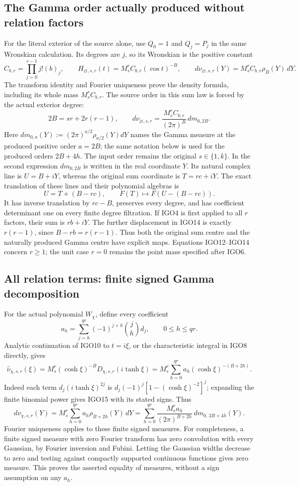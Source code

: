 \documentclass[11pt,a4paper]{article}
\begin{document}
\subsection{The Gamma order actually produced without relation factors}
For the literal exterior of the source alone, use $Q_0=1$ and
$Q_j=P_j$ in the same Wronskian calculation. Its degrees are
$j$, so its Wronskian is the positive constant
\[
 C_{b,r}=\prod_{j=0}^{r-1}j!(b)_j,\qquad
 H_{\varnothing,s,r}(t)=M_s^r C_{b,r}(\cos t)^{-B},
 \qquad
 d\nu_{\varnothing,s,r}(Y)=M_s^r C_{b,r}\rho_B(Y)\,dY.
 \tag{IGO12}
\]
The transform identity and Fourier uniqueness prove the density
formula, including its whole mass $M_s^r C_{b,r}$. The source
order in this sum law is forced by the actual exterior degree:
\[
 2B=sr+2r(r-1),\qquad
 d\nu_{\varnothing,s,r}
    =\frac{M_s^r C_{b,r}}{(2\pi)^B}\,dm_{0,2B}.
 \tag{IGO13}
\]
Here $dm_{0,a}(Y):=(2\pi)^{a/2}\rho_{a/2}(Y)dY$ names
the Gamma measure at the produced positive order $a=2B$;
the same notation below is used for the produced orders $2B+4h$.
The input order remains the original $s\in\{1,k\}$.
In the second expression $dm_{0,2B}$ is written in the real
coordinate $Y$. Its natural complex line is $U=B+iY$, whereas
the original sum coordinate is $T=rc+iY$. The exact translation
of these lines and their polynomial algebras is
\[
 U=T+(B-rc),\qquad
 F(T)\longmapsto F(U-(B-rc)).
 \tag{IGO14}
\]
It has inverse translation by $rc-B$, preserves every degree,
and has coefficient determinant one on every finite degree
filtration. If IGO4 is first applied to all $r$ factors, their
sum is $rb+iY$. The further displacement in IGO14 is exactly
$r(r-1)$, since $B-rb=r(r-1)$. Thus both the original sum centre
and the naturally produced Gamma centre have explicit maps.
Equations IGO12--IGO14 concern $r\geq1$; the unit case $r=0$
remains the point mass specified after IGO6.

\subsection{All relation terms: finite signed Gamma decomposition}
For the actual polynomial $W_\chi$, define every coefficient
\[
 a_h=\sum_{j=h}^{qr}(-1)^{j+h}\binom{j}{h}d_j,
 \qquad 0\leq h\leq qr.
 \tag{IGO15}
\]
Analytic continuation of IGO10 to $t=i\xi$, or the characteristic
integral in IGO8 directly, gives
\[
 \widehat\nu_{\chi,s,r}(\xi)
 =M_s^r(\cosh\xi)^{-B}D_{\chi,s,r}(i\tanh\xi)
 =M_s^r\sum_{h=0}^{qr}a_h(\cosh\xi)^{-(B+2h)}.
 \tag{IGO16}
\]
Indeed each term $d_j(i\tanh\xi)^{2j}$ is
$d_j(-1)^j[1-(\cosh\xi)^{-2}]^j$; expanding the finite
binomial power gives IGO15 with its stated signs. Thus
\[
 d\nu_{\chi,s,r}(Y)
  =M_s^r\sum_{h=0}^{qr}a_h\rho_{B+2h}(Y)\,dY
  =\sum_{h=0}^{qr}\frac{M_s^r a_h}{(2\pi)^{B+2h}}
                   \,dm_{0,\,2B+4h}(Y).
 \tag{IGO17}
\]
Fourier uniqueness applies to these finite signed measures. For
completeness, a finite signed measure with zero Fourier transform
has zero convolution with every Gaussian, by Fourier inversion
and Fubini. Letting the Gaussian widths decrease to zero and
testing against compactly supported continuous functions gives
zero measure. This proves the asserted equality of measures,
without a sign assumption on any $a_h$.
\end{document}
